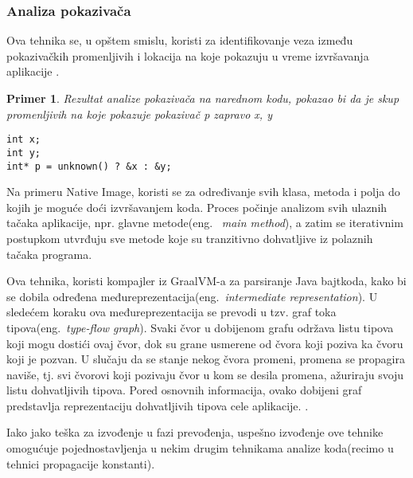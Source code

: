 \documentclass[a4paper]{article}
\newtheorem{primer}{Primer}[section]
\begin{document}
\subsubsection{Analiza pokazivača} 
Ova tehnika se, u opštem smislu, koristi za identifikovanje veza između pokazivačkih promenljivih i lokacija na koje pokazuju u vreme izvršavanja aplikacije \cite{AnalizaPokazivaca}.
\begin{primer}
Rezultat analize pokazivača na narednom kodu, pokazao bi da je skup promenljivih na koje pokazuje pokazivač p zapravo {x, y}
    \begin{lstlisting}[caption={Primer koda koji se analizira od strane tehnike analize pokazivača},frame=single, label=simple]
int x;
int y;
int* p = unknown() ? &x : &y;
    \end{lstlisting}
\end{primer}

Na primeru Native Image, koristi se za određivanje svih klasa, metoda i polja do kojih je moguće doći
izvršavanjem koda. Proces  počinje analizom svih ulaznih tačaka aplikacije, npr. glavne metode(eng.~{\em
main method}), a zatim se iterativnim postupkom utvrđuju sve metode koje su tranzitivno dohvatljive iz
polaznih tačaka programa.

Ova tehnika, koristi kompajler iz GraalVM-a za parsiranje Java bajtkoda, kako bi se dobila određena međureprezentacija(eng.~{\em intermediate representation}). U sledećem koraku ova međureprezentacija se prevodi u tzv. graf toka tipova(eng.~{\em type-flow graph}). Svaki čvor u dobijenom grafu održava listu tipova koji mogu dostići ovaj čvor, dok su grane usmerene od čvora koji poziva ka čvoru koji je pozvan. U slučaju da se stanje nekog čvora promeni, promena se propagira naviše, tj. svi čvorovi koji pozivaju čvor u kom se desila promena, ažuriraju svoju listu dohvatljivih tipova. Pored osnovnih informacija,  ovako dobijeni graf predstavlja reprezentaciju dohvatljivih tipova cele aplikacije. \cite{AnalizaPokazivaca}.

Iako jako teška za izvođenje u fazi prevođenja, uspešno izvođenje ove tehnike omogućuje pojednostavljenja u nekim drugim tehnikama analize koda(recimo u tehnici propagacije konstanti).
\end{document}
